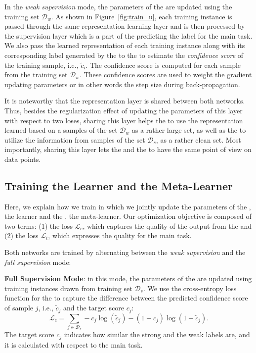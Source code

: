 In the \emph{weak supervision} mode, the parameters of the \tnet are updated using the training set $\mathcal{D}_w$.
As shown in Figure~\ref{fig:train_u}, each training instance is passed through the same representation learning layer and is then processed by the supervision layer which is a part of the \tnet predicting the label for the main task. 
%
We also pass the learned representation of each training instance along with its corresponding label generated by the \wa to the \cnet to estimate the \emph{confidence score} of the training sample, i.e., $\tilde{c}_i$. 
The confidence score is computed for each sample from the training set $\mathcal{D}_w$. These confidence scores are used to weight the gradient updating \tnet parameters or in other words the step size during back-propagation. 

It is noteworthy that the representation layer is shared between both networks.  Thus, besides the regularization effect of updating the parameters of this layer with respect to two loses, sharing this layer helps the \cnet to use the representation learned based on a samples of the set $\mathcal{D}_w$ as a rather large set, as well as the \tnet to utilize the information from samples of the set $\mathcal{D}_s$, as a rather clean set. Most importantly, sharing this layer lets the \cnet and the \tnet to have the same point of view on data points.

\subsection{Training the Learner and the Meta-Learner}
\label{sec:modeltraining}
Here, we explain how we train \cws in which we jointly update the parameters of the \tnet, the learner and the \cnet, the meta-learner. 
Our optimization objective is composed of two terms: (1) the \cnet loss $\mathcal{L}_c$, which captures the quality of the output from the \cnet and (2) the \tnet loss $\mathcal{L}_t$, which expresses the quality for the main task. 

Both networks are trained by alternating between the \emph{weak supervision} and the \emph{full supervision} mode:


\textbf{Full Supervision Mode}: in this mode, the parameters of the \cnet are updated using training instances drawn from training set $\mathcal{D}_s$. We use the cross-entropy loss function for the \cnet to capture the difference between the predicted confidence score of sample $j$, i.e., $\tilde{c}_j$ and the target score $c_j$:
\begin{equation}
\mathcal{L}_c = \sum_{j\in \mathcal{D}_s} -  c_j \log(\tilde{c}_j) - (1-c_j) \log(1-\tilde{c}_j).
\end{equation}
The target score $c_j$ indicates how similar the strong and the weak labels are, and it is calculated with respect to the main task. 

